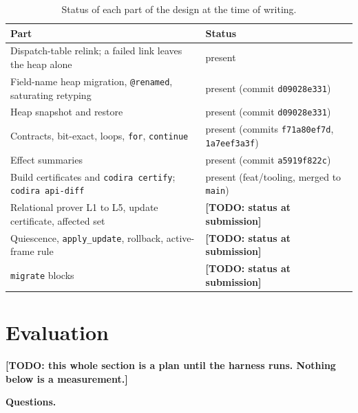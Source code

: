 \documentclass[10pt,twocolumn]{article}
\newcommand{\todo}[1]{{\color{red}\textbf{[TODO: #1]}}}
\begin{document}
\begin{table}[t]\centering\small
\begin{tabular}{ll}\toprule
Part & Status \\
\midrule
Dispatch-table relink; a failed link leaves the heap alone & present \\
Field-name heap migration, \texttt{@renamed}, saturating retyping & present (commit \texttt{d09028e331}) \\
Heap snapshot and restore & present (commit \texttt{d09028e331}) \\
Contracts, bit-exact, loops, \texttt{for}, \texttt{continue} & present (commits \texttt{f71a80ef7d}, \texttt{1a7eef3a3f}) \\
Effect summaries & present (commit \texttt{a5919f822c}) \\
Build certificates and \texttt{codira certify}; \texttt{codira api-diff} & present (feat/tooling, merged to \texttt{main}) \\
Relational prover L1 to L5, update certificate, affected set & \todo{status at submission} \\
Quiescence, \texttt{apply\_update}, rollback, active-frame rule & \todo{status at submission} \\
\texttt{migrate} blocks & \todo{status at submission} \\
\bottomrule
\end{tabular}
\caption{Status of each part of the design at the time of writing.}\label{tab-status}
\end{table}
\section{Evaluation}\label{sec-eval}
\todo{this whole section is a plan until the harness runs. Nothing below is a measurement.}

\textbf{Questions.}
\end{document}

